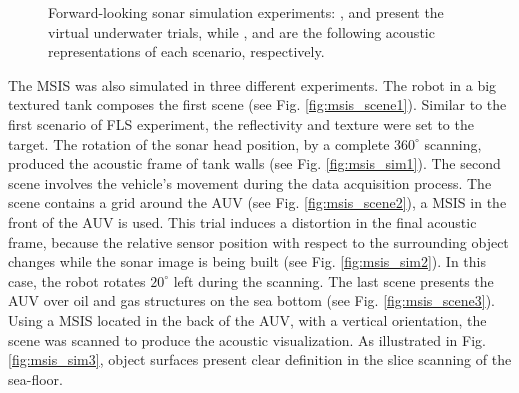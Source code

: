 \documentclass[final,5p,times]{elsarticle}
\begin{document}
\begin{figure}[!ht]
{        \label{fig:fls_sim2}
    }
    \captionsetup{justification=centering}
    \caption{Forward-looking sonar simulation experiments:
    ,  and 
    present the virtual underwater trials, while ,
     and  are the following acoustic
    representations of each scenario, respectively.}
    \label{fig:fls}
\end{figure}

The MSIS was also simulated in three different experiments. The robot in a
big textured tank composes the first scene (see Fig.
\ref{fig:msis_scene1}). Similar to the first scenario of FLS experiment,
the reflectivity and texture were set to the target. The rotation of the
sonar head position, by a complete $360^{\circ}$ scanning, produced the acoustic
frame of tank walls (see Fig. \ref{fig:msis_sim1}). The second scene
involves the vehicle's movement during the data acquisition process. The scene
contains a grid around the AUV (see Fig. \ref{fig:msis_scene2}), a MSIS in
the front of the AUV is used. This trial induces a distortion in the final
acoustic frame, because the relative sensor position with respect to the
surrounding object changes while the sonar image is being built (see
Fig. \ref{fig:msis_sim2}). In this case, the robot rotates $20^{\circ}$ left
during the scanning. The last scene presents the AUV over oil
and gas structures on the sea bottom (see Fig. \ref{fig:msis_scene3}).
Using a MSIS located in the back of the AUV, with a vertical orientation,
the scene was scanned to produce the acoustic visualization. As illustrated
in Fig. \ref{fig:msis_sim3}, object surfaces present clear definition in
the slice scanning of the sea-floor.
\end{document}
